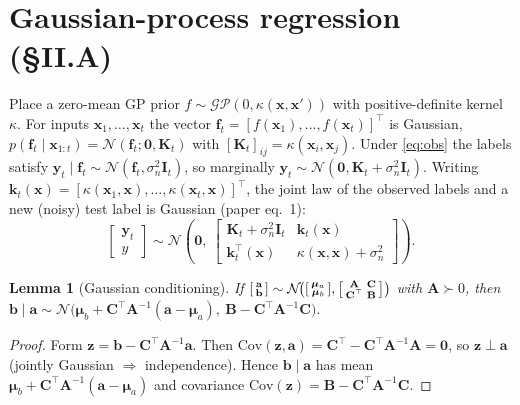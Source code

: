 \documentclass[11pt]{article}
\theoremstyle{plain}
\newtheorem{lemma}{Lemma}
\theoremstyle{definition}
\newcommand{\N}{\mathcal{N}}
\newcommand{\K}{\mathbf{K}}
\newcommand{\I}{\mathbf{I}}
\newcommand{\x}{\mathbf{x}}
\newcommand{\y}{\mathbf{y}}
\newcommand{\sn}{\sigma_n}
\begin{document}
\section{Gaussian-process regression (\S II.A)}\label{sec:gp}
Place a zero-mean GP prior $f\sim\mathcal{GP}(0,\kappa(\x,\x'))$ with positive-definite kernel $\kappa$. For inputs $\x_1,\dots,\x_t$ the vector $\mathbf f_t=[f(\x_1),\dots,f(\x_t)]^\top$ is Gaussian, $p(\mathbf f_t\mid\x_{1:t})=\N(\mathbf f_t;\mathbf 0,\K_t)$ with $[\K_t]_{ij}=\kappa(\x_i,\x_j)$. Under \eqref{eq:obs} the labels satisfy $\y_t\mid\mathbf f_t\sim\N(\mathbf f_t,\sn^2\I_t)$, so marginally $\y_t\sim\N(\mathbf 0,\K_t+\sn^2\I_t)$. Writing $\mathbf k_t(\x)=[\kappa(\x_1,\x),\dots,\kappa(\x_t,\x)]^\top$, the joint law of the observed labels and a new (noisy) test label is Gaussian (paper eq.~1):
\begin{equation}
\begin{bmatrix}\y_t\\ y\end{bmatrix}\sim\N\!\left(\mathbf 0,\ \begin{bmatrix}\K_t+\sn^2\I_t & \mathbf k_t(\x)\\ \mathbf k_t^\top(\x) & \kappa(\x,\x)+\sn^2\end{bmatrix}\right).
\label{eq:joint}
\end{equation}

\begin{lemma}[Gaussian conditioning]\label{lem:cond}
If $\begin{bsmallmatrix}\mathbf a\\ \mathbf b\end{bsmallmatrix}\sim\N\!\big(\begin{bsmallmatrix}\boldsymbol\mu_a\\ \boldsymbol\mu_b\end{bsmallmatrix},\begin{bsmallmatrix}\mathbf A&\mathbf C\\ \mathbf C^\top&\mathbf B\end{bsmallmatrix}\big)$ with $\mathbf A\succ0$, then
$\mathbf b\mid\mathbf a\sim\N\big(\boldsymbol\mu_b+\mathbf C^\top\mathbf A^{-1}(\mathbf a-\boldsymbol\mu_a),\ \mathbf B-\mathbf C^\top\mathbf A^{-1}\mathbf C\big).$
\end{lemma}
\begin{proof}
Form $\mathbf z=\mathbf b-\mathbf C^\top\mathbf A^{-1}\mathbf a$. Then $\mathrm{Cov}(\mathbf z,\mathbf a)=\mathbf C^\top-\mathbf C^\top\mathbf A^{-1}\mathbf A=\mathbf 0$, so $\mathbf z\perp\mathbf a$ (jointly Gaussian $\Rightarrow$ independence). Hence $\mathbf b\mid\mathbf a$ has mean $\boldsymbol\mu_b+\mathbf C^\top\mathbf A^{-1}(\mathbf a-\boldsymbol\mu_a)$ and covariance $\mathrm{Cov}(\mathbf z)=\mathbf B-\mathbf C^\top\mathbf A^{-1}\mathbf C$.
\end{proof}
\end{document}
